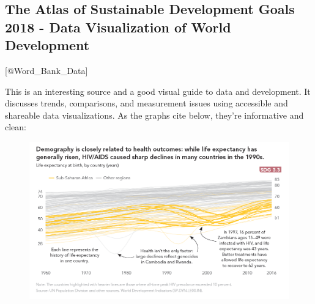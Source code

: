 \documentclass[]{book}
\theoremstyle{definition}
\theoremstyle{definition}
\theoremstyle{definition}
\theoremstyle{remark}
\begin{document}
\subsection{The Atlas of Sustainable Development Goals 2018 - Data
Visualization of World
Development}\label{the-atlas-of-sustainable-development-goals-2018---data-visualization-of-world-development}

{[}@Word\_Bank\_Data{]}

This is an interesting source and a good visual guide to data and
development. It discusses trends, comparisons, and measurement issues
using accessible and shareable data visualizations. As the graphs cite
below, they're informative and clean:

\begin{figure}
\centering
\includegraphics{images/case study 1.png}
\caption{}
\end{figure}
\end{document}
